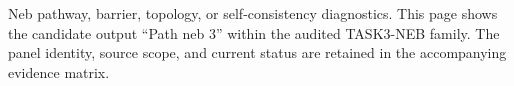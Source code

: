 Neb pathway, barrier, topology, or self-consistency diagnostics. This page shows the candidate output ``Path neb 3'' within the audited TASK3-NEB family. The panel identity, source scope, and current status are retained in the accompanying evidence matrix.
